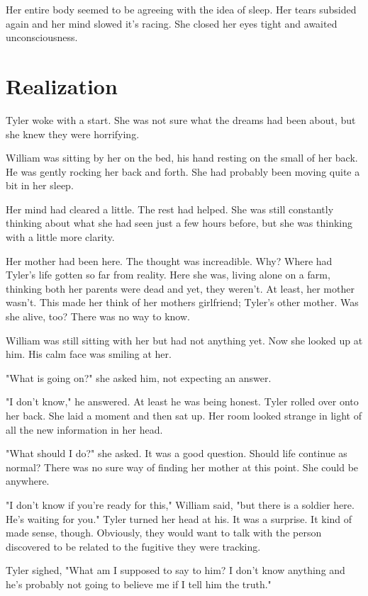 \documentclass[courier]{sffms}
\begin{document}
Her entire body seemed to be agreeing with the
idea of sleep. Her tears subsided again and her
mind slowed it's racing. She closed her eyes 
tight and awaited unconsciousness.

\chapter{Realization}
Tyler woke with a start. She was not sure what
the dreams had been about, but she knew they
were horrifying.

William was sitting by her on the bed, his hand
resting on the small of her back. He was gently
rocking her back and forth. She had probably
been moving quite a bit in her sleep.

Her mind had cleared a little. The rest had helped.
She was still constantly thinking about
what she had seen just a few hours before, but
she was thinking with a little more clarity.

Her mother had been here. The thought was
increadible. Why? Where had Tyler's life
gotten so far from reality. Here she was, living
alone on a farm, thinking both her parents
were dead and yet, they weren't. At least,
her mother wasn't. This made her think
of her mothers girlfriend; Tyler's other
mother. Was she alive, too? There was no
way to know.

William was still sitting with her but had not
anything yet. Now she looked up at him. His
calm face was smiling at her.

"What is going on?" she asked him, not expecting
an answer.

"I don't know," he answered. At least he was
being honest. Tyler rolled over onto her back.
She laid a moment and then sat up. Her
room looked strange in light of all the new
information in her head.

"What should I do?" she asked. It was a 
good question. Should life continue as normal?
There was no sure way of finding her
mother at this point. She could be anywhere.

"I don't know if you're ready for this,"
William said, "but there is a soldier here.
He's waiting for you." Tyler turned her
head at his. It was a surprise. It kind of
made sense, though. Obviously, they
would want to talk with the person 
discovered to be related to the fugitive
they were tracking.

Tyler sighed, "What am I supposed to
say to him? I don't know anything and
he's probably not going to believe me if
I tell him the truth."
\end{document}
